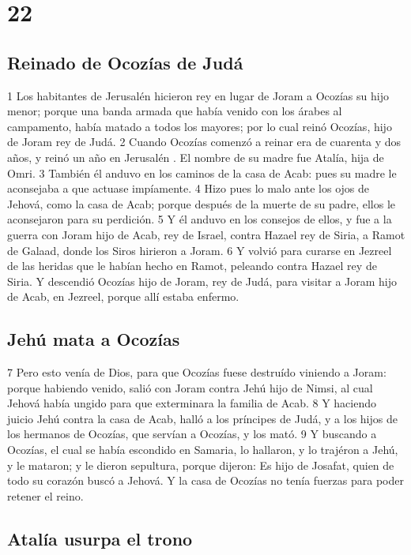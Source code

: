 \chapter{22}

\section*{Reinado de Ocozías de Judá}

1 Los habitantes de Jerusalén  hicieron rey en lugar de Joram a Ocozías su hijo menor; porque una banda armada que  había venido con los árabes al campamento, había matado a todos los mayores; por lo cual reinó Ocozías, hijo de Joram rey de Judá.
2 Cuando Ocozías comenzó a reinar era de cuarenta y dos años, y reinó un año en Jerusalén . El nombre de su madre fue Atalía, hija de Omri.
3 También él anduvo en los caminos de la casa de Acab: pues su madre le aconsejaba a que actuase impíamente.
4 Hizo pues lo malo ante los ojos de Jehová, como la casa de Acab; porque después de la muerte de su padre, ellos le aconsejaron para su perdición.
5 Y él anduvo en los consejos de ellos, y fue a la guerra con Joram hijo de Acab, rey de Israel, contra Hazael rey de Siria, a Ramot de Galaad, donde los Siros hirieron a Joram.
6 Y volvió para curarse en Jezreel de las heridas que le habían hecho en Ramot, peleando contra Hazael rey de Siria. Y descendió Ocozías hijo de Joram, rey de Judá, para visitar a Joram hijo de Acab, en Jezreel, porque allí estaba enfermo.

\section*{Jehú mata a Ocozías}

7  Pero esto venía de Dios, para que Ocozías fuese destruído viniendo a Joram: porque habiendo venido, salió con Joram contra Jehú hijo de Nimsi, al cual Jehová había ungido para que exterminara la familia de Acab.
8 Y haciendo juicio Jehú contra la casa de Acab, halló a los príncipes de Judá, y a los hijos de los hermanos de Ocozías, que servían a Ocozías, y los mató.
9 Y buscando a Ocozías, el cual se había escondido en Samaria, lo hallaron, y lo trajéron a Jehú, y le mataron; y le dieron sepultura, porque dijeron: Es hijo de Josafat, quien de todo su corazón buscó a Jehová. Y la casa de Ocozías no tenía fuerzas para poder retener el reino.

\section*{Atalía usurpa el trono}

